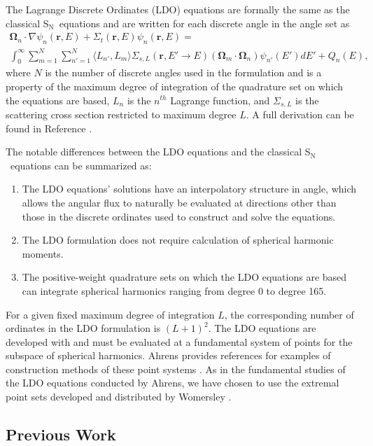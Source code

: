 \documentclass{article} %
\newcommand{\bo}{\mathbf\Omega}
\newcommand{\vecr}{\textbf{r}}
\newcommand{\sn}{S$_\mathrm{N}$}
\begin{document}
The Lagrange Discrete Ordinates (LDO) equations are formally the same as the
classical \sn\ equations and are written for each discrete angle in the angle
set as
%
\begin{multline}
\bo_n\cdot\nabla\psi_{n}(\vecr,E) + 
\Sigma_{t}(\vecr,E)\psi_{n}(\vecr,E) = \\
\int_0^\infty\sum_{m=1}^{N}\sum_{n'=1}^{N}\langle L_{n'},L_{m}\rangle
\Sigma_{s,L}(\vecr,E'\rightarrow E)(\bo_{m}\cdot\bo_n)\psi_{n'}(E')dE'
+ Q_{n}(E),
\end{multline}
%
where $N$ is the number of discrete angles used in the formulation
and is a property of the maximum degree of integration of the quadrature set
on which the equations are based, $L_n$ is the $n^{th}$ Lagrange function, and
$\Sigma_{s,L}$ is the scattering cross section restricted to maximum degree
$L$. A full derivation can be found in Reference \cite{ahrens}.

The notable differences between the LDO equations and the classical \sn\
equations can be summarized as:

\begin{enumerate}
\item{The LDO equations' solutions have an interpolatory structure in angle,
      which allows the angular flux to naturally be evaluated at directions
      other than those in the discrete ordinates used to construct and solve
      the equations.}
\item{The LDO formulation does not require calculation of spherical harmonic
      moments.}
\item{The positive-weight quadrature sets on which the LDO equations are based
      can integrate spherical harmonics ranging from degree 0 to degree 165.}
\end{enumerate}

For a given fixed maximum degree of integration $L$, the corresponding number
of ordinates in the LDO formulation is $(L+1)^2$. The LDO equations are
developed with and must be evaluated at a fundamental system of points for the
subspace of spherical harmonics. Ahrens provides references for examples of
construction methods of these point systems \cite{ahrens}. As in the 
fundamental studies of the LDO equations conducted by Ahrens, we
have chosen to use the extremal point sets developed and distributed by
Womersley \cite{wom}.

\subsection{Previous Work}
\end{document}
